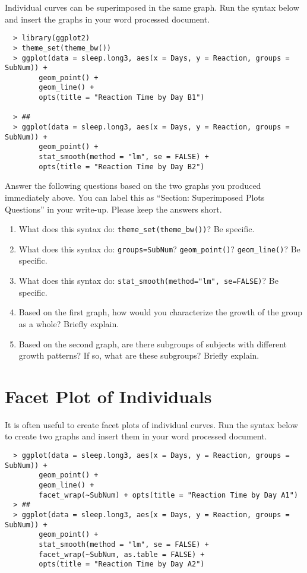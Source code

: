 \documentclass[]{article}
\begin{document}
\noindent Individual curves can be superimposed in the same graph. Run the syntax below and insert the graphs in your word processed document.

\begin{verbatim}
  > library(ggplot2)
  > theme_set(theme_bw())
  > ggplot(data = sleep.long3, aes(x = Days, y = Reaction, groups = SubNum)) + 
        geom_point() + 
        geom_line() +
        opts(title = "Reaction Time by Day B1")

  > ##
  > ggplot(data = sleep.long3, aes(x = Days, y = Reaction, groups = SubNum)) + 
        geom_point() +
        stat_smooth(method = "lm", se = FALSE) +
        opts(title = "Reaction Time by Day B2")
\end{verbatim}

\noindent Answer the following questions based on the two graphs you produced immediately above. You can label this as ``Section: Superimposed Plots Questions'' in your write-up. Please keep the answers short.

\begin{enumerate}[resume]
\item What does this syntax do: \verb|theme_set(theme_bw())|? Be specific.
\item What does this syntax do: \texttt{groups=SubNum}? \verb|geom_point()|? \verb|geom_line()|? Be specific.
\item What does this syntax do:  \verb|stat_smooth(method="lm", se=FALSE)|? Be specific.
\item Based on the first graph, how would you characterize the growth of the group as a whole? Briefly explain.
\item Based on the second graph, are there subgroups of subjects with different growth patterns? If so, what are these subgroups? Briefly explain.
\end{enumerate}


%
%
\pagebreak
\section*{Facet Plot of Individuals}

\noindent It is often useful to create facet plots of individual curves. Run the syntax below to create two graphs and insert them in your word processed document.

\begin{verbatim}
  > ggplot(data = sleep.long3, aes(x = Days, y = Reaction, groups = SubNum)) +
        geom_point() + 
        geom_line() +
        facet_wrap(~SubNum) + opts(title = "Reaction Time by Day A1")
  > ##
  > ggplot(data = sleep.long3, aes(x = Days, y = Reaction, groups = SubNum)) +
        geom_point() +
        stat_smooth(method = "lm", se = FALSE) + 
        facet_wrap(~SubNum, as.table = FALSE) +  
        opts(title = "Reaction Time by Day A2")
\end{verbatim}
\end{document}
